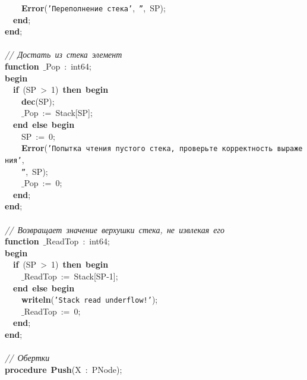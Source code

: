 \mbox{}\ \ \ \ \textbf{Error}(\texttt{'Переполнение\ стека'},\ \texttt{''},\ SP); \\
\mbox{}\ \ \textbf{end}; \\
\mbox{}\textbf{end}; \\
\mbox{} \\
\mbox{}\textit{//\ Достать\ из\ стека\ элемент} \\
\mbox{}\textbf{function}\ $\_$Pop\ :\ int64; \\
\mbox{}\textbf{begin} \\
\mbox{}\ \ \textbf{if}\ (SP\ \textgreater{}\ 1)\ \textbf{then}\ \textbf{begin} \\
\mbox{}\ \ \ \ \textbf{dec}(SP); \\
\mbox{}\ \ \ \ $\_$Pop\ :=\ Stack[SP]; \\
\mbox{}\ \ \textbf{end}\ \textbf{else}\ \textbf{begin} \\
\mbox{}\ \ \ \ SP\ :=\ 0; \\
\mbox{}\ \ \ \ \textbf{Error}(\texttt{'Попытка\ чтения\ пустого\ стека,\ проверьте\ корректность\ выражения'}, \\
\mbox{}\ \ \ \ \texttt{''},\ SP); \\
\mbox{}\ \ \ \ $\_$Pop\ :=\ 0; \\
\mbox{}\ \ \textbf{end}; \\
\mbox{}\textbf{end}; \\
\mbox{} \\
\mbox{}\textit{//\ Возвращает\ значение\ верхушки\ стека,\ не\ извлекая\ его} \\
\mbox{}\textbf{function}\ $\_$ReadTop\ :\ int64; \\
\mbox{}\textbf{begin} \\
\mbox{}\ \ \textbf{if}\ (SP\ \textgreater{}\ 1)\ \textbf{then}\ \textbf{begin} \\
\mbox{}\ \ \ \ $\_$ReadTop\ :=\ Stack[SP-1]; \\
\mbox{}\ \ \textbf{end}\ \textbf{else}\ \textbf{begin} \\
\mbox{}\ \ \ \ \textbf{writeln}(\texttt{'Stack\ read\ underflow!'}); \\
\mbox{}\ \ \ \ $\_$ReadTop\ :=\ 0; \\
\mbox{}\ \ \textbf{end}; \\
\mbox{}\textbf{end}; \\
\mbox{} \\
\mbox{}\textit{//\ Обертки} \\
\mbox{}\textbf{procedure}\ \textbf{Push}(X\ :\ PNode); \\
